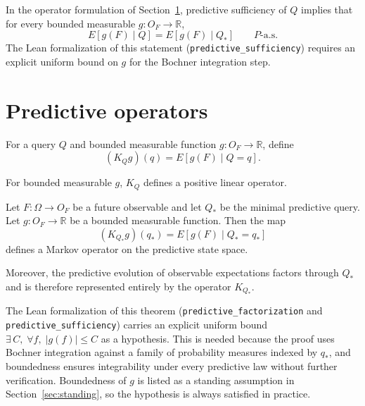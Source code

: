 \begin{remark}
In the operator formulation of Section~\ref{sec:predictive-operators},
predictive sufficiency of $Q$ implies that for every bounded measurable
$g:O_F\to\mathbb R$,
\[
E[g(F)\mid Q] = E[g(F)\mid Q_*]
\qquad P\text{-a.s.}
\]
The Lean formalization of this statement (\texttt{predictive\_sufficiency})
requires an explicit uniform bound on $g$ for the Bochner integration step.
\end{remark}

\section{Predictive operators}\label{sec:predictive-operators}

\begin{definition}
For a query $Q$ and bounded measurable function
$g:O_F\to\mathbb R$, define
\[
(K_Q g)(q)
=
E[g(F)\mid Q=q].
\]
\end{definition}

\begin{proposition}
For bounded measurable $g$, $K_Q$ defines a positive linear operator.
\end{proposition}

\begin{theorem}
Let $F:\Omega\to O_F$ be a future observable and let $Q_*$ be the
minimal predictive query.  Let $g:O_F\to\mathbb R$ be a bounded
measurable function.  Then the map
\[
(K_{Q_*}g)(q_*)
=
E[g(F)\mid Q_*=q_*]
\]
defines a Markov operator on the predictive state space.

Moreover, the predictive evolution of observable expectations factors
through $Q_*$ and is therefore represented entirely by the operator
$K_{Q_*}$.
\end{theorem}

\begin{remark}
The Lean formalization of this theorem (\texttt{predictive\_factorization}
and \texttt{predictive\_sufficiency}) carries an explicit uniform bound
$\exists\,C,\;\forall f,\;|g(f)|\le C$ as a hypothesis.  This is needed
because the proof uses Bochner integration against a family of probability
measures indexed by $q_*$, and boundedness ensures integrability under
every predictive law without further verification.  Boundedness of $g$ is
listed as a standing assumption in Section~\ref{sec:standing}, so the
hypothesis is always satisfied in practice.
\end{remark}

